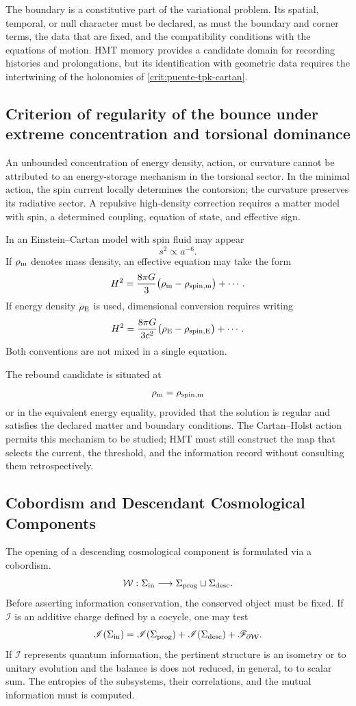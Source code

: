The boundary is a constitutive part of the variational problem. Its
spatial, temporal, or null character must be declared, as must the boundary and
corner terms, the data that are fixed, and the compatibility conditions with the
equations of motion. HMT memory provides a candidate domain
for recording histories and prolongations, but its identification with
geometric data requires the intertwining of the holonomies of
\cref{crit:puente-tpk-cartan}.

\subsection{Criterion of regularity of the bounce under extreme concentration and torsional dominance}
\label{sec:rebote-cosmologico-condicionado}

An unbounded concentration of energy density, action, or curvature cannot
be attributed to an energy-storage mechanism in the
torsional sector. In the minimal action, the spin current locally determines the
contorsion; the curvature preserves its radiative sector. A
repulsive high-density correction requires a matter model with spin, a
determined coupling, equation of state, and effective sign.

In an Einstein--Cartan model with spin fluid may appear
\[
 s^2\propto a^{-6}.
\]
If \(\rho_{\rm m}\) denotes mass density, an effective equation may
take the form
\[
 H^2
 =
 \frac{8\pi G}{3}
 \bigl(\rho_{\rm m}-\rho_{\rm spin,m}\bigr)
 +\cdots.
\]
If energy density \(\rho_{\rm E}\) is used, dimensional conversion
requires writing
\[
 H^2
 =
 \frac{8\pi G}{3c^2}
 \bigl(\rho_{\rm E}-\rho_{\rm spin,E}\bigr)
 +\cdots.
\]
Both conventions are not mixed in a single equation.

The rebound candidate is situated at
\[
 \rho_{\rm m}=\rho_{\rm spin,m}
\]
or in the equivalent energy equality, provided that the solution is regular
and satisfies the declared matter and boundary conditions. The
Cartan--Holst action permits this mechanism to be studied; HMT must still construct the
map that selects the current, the threshold, and the information record without
consulting them retrospectively.

\subsection{Cobordism and Descendant Cosmological Components}
\label{sec:cobordismo-universo-hijo}

The opening of a descending cosmological component is formulated via a cobordism.
\[
 \mathcal W:
 \Sigma_{\rm in}
 \longrightarrow
 \Sigma_{\rm prog}\sqcup\Sigma_{\rm desc}.
\]
Before asserting information conservation, the conserved object must be fixed.
If \(\mathscr I\) is an additive charge defined by a cocycle,
one may test
\[
 \mathscr I(\Sigma_{\rm in})
 =
 \mathscr I(\Sigma_{\rm prog})
 +\mathscr I(\Sigma_{\rm desc})
 +\mathscr F_{\partial\mathcal W}.
\]
If \(\mathscr I\) represents quantum information, the pertinent structure
is an isometry or to unitary evolution and the balance is does not reduced, in
general, to to scalar sum. The entropies of the
subsystems, their correlations, and the mutual information must is computed.


